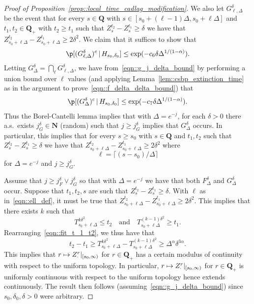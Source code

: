 \documentclass[JEP,XML,SOM,Unicode]{cedram}
\newcommand\mto{\mathchoice{\longmapsto}{\mapsto}{\mapsto}{\mapsto}}
\theoremstyle{plain}
\numberwithin{theorem}{section}
\theoremstyle{definition}
\newcommand{\N}{\mathbf{N}}
\newcommand{\Q}{{\mathbf Q}}
\newcommand{\giv}{\,|\,}
\begin{document}
\begin{proof}[Proof of Proposition~\ref{prop::local_time_cadlag_modification}]
We also let $G_{\ell,\Delta}^{\delta}$ be the event that for every $s \in \Q$ with $s \in [s_0 + (\ell-1) \Delta,s_0 + \ell\Delta]$ and $t_1,t_2 \in \Q_+$ with $t_2 \geq t_1$ such that $Z_s^{t_2} - Z_s^{t_1} \geq \delta$ we have that $Z_{s_0 + \ell \Delta}^{t_2} - Z_{s_0 + \ell \Delta}^{t_1} \geq 2\delta^2$. We claim that it suffices to show that
\begin{equation}
\label{eqn::g_j_delta_bound}
\p[ (G_{\ell,\Delta}^{\delta})^c \giv H_{s_0,\delta_0}] \leq \exp(-c_6 \delta \Delta^{1/(1-\alpha)}).
\end{equation}
Letting $G_\Delta^{\delta} = \bigcap_\ell G_{\ell,\Delta}^{\delta}$, we have from~\eqref{eqn::g_j_delta_bound} by performing a union bound over $\ell$ values (and applying Lemma~\ref{lem::csbp_extinction_time} as in the argument to prove~\eqref{eqn::f_delta_delta_bound}) that
\[
\p[ (G_\Delta^\delta)^c \giv H_{s_0,\delta_0}] \leq \exp(-c_7 \delta \Delta^{1/(1-\alpha)}).
\]
Thus the Borel-Cantelli lemma implies that with $\Delta = e^{-j}$, for each $\delta > 0$ there a.s.\ exists $j_G^\delta \in \N$ (random) such that $j \geq j_G^\delta$ implies that $G_\Delta^\delta$ occurs. In particular, this implies that for every $s \geq s_0$ with $s \in \Q$ and $t_1,t_2$ such that $Z_s^{t_2} - Z_s^{t_1} \geq \delta$ we have that $Z_{s_0 + \ell \Delta}^{t_2} - Z_{s_0 + \ell\Delta}^{t_1} \geq 2\delta^2$ where\vspace*{-3pt}
\begin{equation}
\label{eqn::ell_def}
\ell = \lceil (s-s_0)/\Delta \rceil
\end{equation}
for $\Delta = e^{-j}$ and $j \geq j_G^\delta$.

Assume that $j \geq j_F^\delta \vee j_G^\delta$ so that with $\Delta = e^{-j}$ we have that both $F_\Delta^\delta$ and $G_\Delta^\delta$ occur. Suppose that $t_1,t_2,s$ are such that $Z_s^{t_2} - Z_s^{t_1} \geq \delta$. With $\ell$ as in~\eqref{eqn::ell_def}, it must be true that $Z_{s_0 + \ell \Delta}^{t_2} - Z_{s_0 + \ell \Delta}^{t_1} \geq 2\delta^2$. This implies that there exists $k$ such that\vspace*{-3pt}
\begin{equation}
\label{eqn::fit_t_1_t2}
T_{s_0 + \ell \Delta}^{k \delta^2} \leq t_2 \quad\text{and}\quad T_{s_0 + \ell \Delta}^{(k-1) \delta^2} \geq t_1.
\end{equation}
Rearranging~\eqref{eqn::fit_t_1_t2}, we thus have that\vspace*{-3pt}
\begin{equation}
\label{eqn::t_2_t_1_diff_bound}
t_2 - t_1 \geq T_{s_0 + \ell \Delta}^{k \delta^2} - T_{s_0 + \ell \Delta}^{(k-1) \delta^2} \geq \Delta^\alpha \delta^{3\alpha}.
\end{equation}
This implies that $r \mto Z_\cdot^r|_{[s_0,\infty)}$ for $r \in \Q_+$ has a certain modulus of continuity with respect to the uniform topology. In particular, $r \mto Z_\cdot^r|_{[s_0,\infty)}$ for $r \in \Q_+$ is uniformly continuous with respect to the uniform topology hence extends continuously. The result then follows (assuming~\eqref{eqn::g_j_delta_bound}) since $s_0,\delta_0,\delta > 0$ were arbitrary.


\end{proof}
\end{document}
